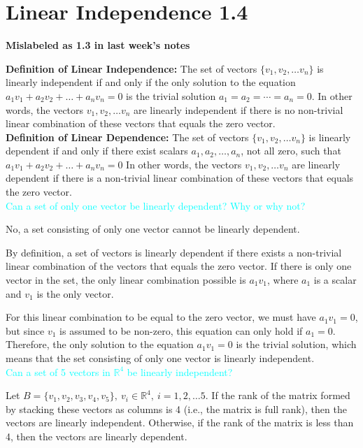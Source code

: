 \documentclass[fontsize=12pt]{scrartcl}
\begin{document}
\newpage

\section{Linear Independence 1.4} 
\centerline{\textbf{Mislabeled as 1.3 in last week's notes}}

\bigskip
\bigskip

\noindent
\textbf{Definition of Linear Independence:} The set of vectors $\{ v_1, v_2, \ldots v_n\}$ is linearly independent if and only if the only solution to the equation $a_1v_1+ a_2v_2 + \ldots + a_nv_n = 0$ is the trivial solution $a_1 = a_2 = \cdots = a_n = 0$. In other words, the vectors $v_1, v_2, \ldots v_n$ are linearly independent if there is no non-trivial linear combination of these vectors that equals the zero vector. \\

\noindent
\textbf{Definition of Linear Dependence:} The set of vectors $\{ v_1, v_2, \ldots v_n\}$ is linearly dependent if and only if there exist scalars $a_1, a_2, \ldots, a_n$, not all zero, such that $a_1v_1+ a_2v_2 + \ldots + a_nv_n = 0$ In other words, the vectors $v_1, v_2, \ldots v_n$ are linearly dependent if there is a non-trivial linear combination of these vectors that equals the zero vector. \\

\noindent
\textcolor{cyan}{Can a set of only one vector be linearly dependent? Why or why not?}

\noindent
No, a set consisting of only one vector cannot be linearly dependent.

\noindent
By definition, a set of vectors is linearly dependent if there exists a non-trivial linear combination of the vectors that equals the zero vector. If there is only one vector in the set, the only linear combination possible is $a_1 v_1$, where $a_1$ is a scalar and $v_1$ is the only vector.

\noindent
For this linear combination to be equal to the zero vector, we must have $a_1 v_1 = 0$, but since $v_1$ is assumed to be non-zero, this equation can only hold if $a_1 = 0$. Therefore, the only solution to the equation $a_1 v_1 = 0$ is the trivial solution, which means that the set consisting of only one vector is linearly independent.
\\

\noindent
\textcolor{cyan}{Can a set of 5 vectors in $\mathbb{R}^4$ be linearly independent?}

\noindent
Let $B = \{ v_1, v_2, v_3, v_4, v_5\}, \ v_i \in \mathbb{R}^4, \ i = 1, 2, \ldots 5$. If the rank of the matrix formed by stacking these vectors as columns is 4 (i.e., the matrix is full rank), then the vectors are linearly independent. Otherwise, if the rank of the matrix is less than 4, then the vectors are linearly dependent.
\end{document}
